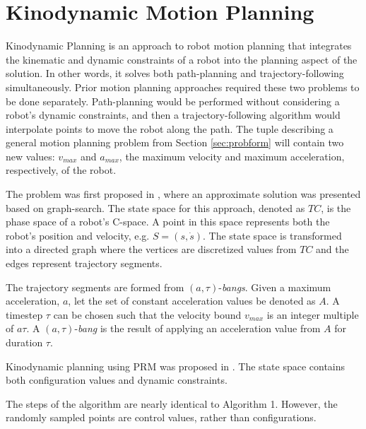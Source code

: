 

\section{ Kinodynamic Motion Planning } \label{sec:kino}

Kinodynamic Planning is an approach to robot motion planning that integrates the kinematic and dynamic constraints of a robot into the planning aspect of the solution. In other words, it solves both path-planning and trajectory-following simultaneously. Prior motion planning approaches required these two problems to be done separately. Path-planning would be performed without considering a robot's dynamic constraints, and then a trajectory-following algorithm would interpolate points to move the robot along the path. The tuple describing a general motion planning problem from Section \ref{sec:probform} will contain two new values: $v_{max}$ and $a_{max}$, the maximum velocity and maximum acceleration, respectively, of the robot.


The problem was first proposed in \cite{donald1993kinodynamic}, where an approximate solution was presented based on graph-search. The state space for this approach, denoted as $TC$, is the phase space of a robot's C-space. A point in this space represents both the robot's position and velocity, e.g. $S=(s, \dot{s})$. The state space is transformed into a directed graph where the vertices are discretized values from $TC$ and the edges represent trajectory segments.

The trajectory segments are formed from $(a, \tau)$-\emph{bangs}. Given a maximum acceleration, $a$, let the set of constant acceleration values be denoted as $A$. A timestep $\tau$ can be chosen such that the velocity bound $v_{max}$ is an integer multiple of $a\tau$. A $(a, \tau)$-\emph{bang} is the result of applying an acceleration value from $A$ for duration $\tau$.



Kinodynamic planning using PRM was proposed in \cite{hsu2002randomized}. The state space contains both configuration values and dynamic constraints.

The steps of the algorithm are nearly identical to Algorithm 1. However, the randomly sampled points are control values, rather than configurations.